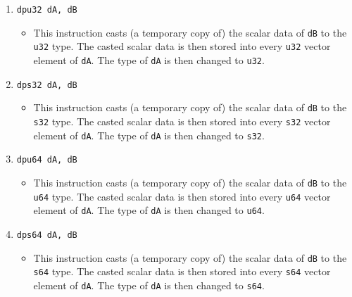 \documentclass{article}
\begin{document}
\begin{itemize}
\begin{enumerate}
			\item \texttt{dpu32 dA, dB}
				\begin{itemize}
				\item This instruction casts (a temporary copy of) the
					scalar data of \texttt{dB} to the \texttt{u32} type.
					The casted scalar data is then stored into every
					\texttt{u32} vector element of \texttt{dA}. The type of
					\texttt{dA} is then changed to \texttt{u32}.
				\end{itemize}
			\item \texttt{dps32 dA, dB}
				\begin{itemize}
				\item This instruction casts (a temporary copy of) the
					scalar data of \texttt{dB} to the \texttt{s32} type.
					The casted scalar data is then stored into every
					\texttt{s32} vector element of \texttt{dA}. The type of
					\texttt{dA} is then changed to \texttt{s32}.
				\end{itemize}
			\item \texttt{dpu64 dA, dB}
				\begin{itemize}
				\item This instruction casts (a temporary copy of) the
					scalar data of \texttt{dB} to the \texttt{u64} type.
					The casted scalar data is then stored into every
					\texttt{u64} vector element of \texttt{dA}. The type of
					\texttt{dA} is then changed to \texttt{u64}.
				\end{itemize}
			\item \texttt{dps64 dA, dB}
				\begin{itemize}
				\item This instruction casts (a temporary copy of) the
					scalar data of \texttt{dB} to the \texttt{s64} type.
					The casted scalar data is then stored into every
					\texttt{s64} vector element of \texttt{dA}. The type of
					\texttt{dA} is then changed to \texttt{s64}.
				\end{itemize}


\end{enumerate}
\end{itemize}
\end{document}
